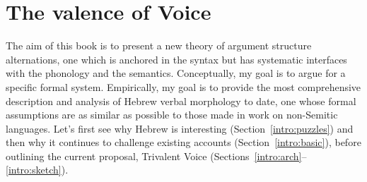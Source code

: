 \chapter{The valence of Voice}
\label{chap:intro}

The aim of this book is to present a new theory of argument structure alternations, one which is anchored in the syntax but has systematic interfaces with the phonology and the semantics. Conceptually, my goal is to argue for a specific formal system. Empirically, my goal is to provide the most comprehensive description and analysis of Hebrew verbal morphology to date, one whose formal assumptions are as similar as possible to those made in work on non-Semitic languages. Let's first see why Hebrew is interesting (Section~\ref{intro:puzzles}) and then why it continues to challenge existing accounts (Section~\ref{intro:basic}), before outlining the current proposal, Trivalent Voice (Sections~\ref{intro:arch}--\ref{intro:sketch}).

